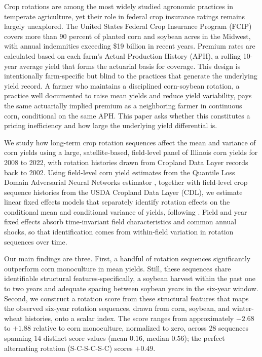 \documentclass[12pt,letterpaper]{article}
\theoremstyle{remark}
\theoremstyle{remark}
\theoremstyle{plain}
\theoremstyle{definition}
\begin{document}
Crop rotations are among the most widely studied agronomic practices in temperate agriculture, yet their role in federal crop insurance ratings remains largely unexplored. The United States Federal Crop Insurance Program (FCIP) covers more than 90 percent of planted corn and soybean acres in the Midwest, with annual indemnities exceeding \$19 billion in recent years. Premium rates are calculated based on each farm's Actual Production History (APH), a rolling 10-year average yield that forms the actuarial basis for coverage. This design is intentionally farm-specific but blind to the practices that generate the underlying yield record. A farmer who maintains a disciplined corn-soybean rotation, a practice well documented to raise mean yields and reduce yield variability, pays the same actuarially implied premium as a neighboring farmer in continuous corn, conditional on the same APH. This paper asks whether this constitutes a pricing inefficiency and how large the underlying yield differential is.
 
We study how long-term crop rotation sequences affect the mean and variance of corn yields using a large, satellite-based, field-level panel of Illinois corn yields for 2008 to 2022, with rotation histories drawn from Cropland Data Layer records back to 2002. Using field-level corn yield estimates from the Quantile Loss Domain Adversarial Neural Networks estimator \citep[QDANN;][]{Ma2024}, together with field-level crop sequence histories from the USDA Cropland Data Layer (CDL), we estimate linear fixed effects models that separately identify rotation effects on the conditional mean and conditional variance of yields, following \citet{Just1979}. Field and year fixed effects absorb time-invariant field characteristics and common annual shocks, so that identification comes from within-field variation in rotation sequences over time.
 
Our main findings are three. First, a handful of rotation sequences significantly outperform corn monoculture in mean yields. Still, these sequences share identifiable structural features-specifically, a soybean harvest within the past one to two years and adequate spacing between soybean years in the six-year window. Second, we construct a rotation score from these structural features that maps the observed six-year rotation sequences, drawn from corn, soybean, and winter-wheat histories, onto a scalar index. The score ranges from approximately $-2.68$ to $+1.88$ relative to corn monoculture, normalized to zero, across 28 sequences spanning 14 distinct score values (mean $0.16$, median $0.56$); the perfect alternating rotation (S-C-S-C-S-C) scores $+0.49$. 
 
\end{document}
